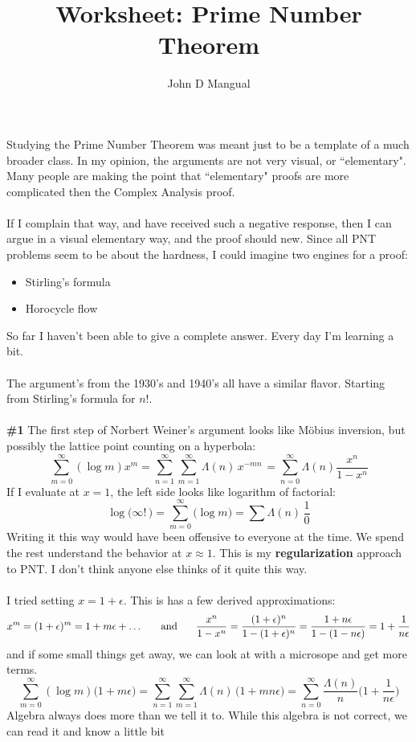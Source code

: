 \documentclass[12pt]{article}
\title{Worksheet: Prime Number Theorem}
\author{John D Mangual}
\date{}
\begin{document}
\selectfont \fontsize{12.5}{15}\selectfont

\maketitle

\noindent Studying the Prime Number Theorem was meant just to be a template of a much broader class.  In my opinion, the arguments are not very visual, or ``elementary".  Many people are making the point that ``elementary" proofs are more complicated then the Complex Analysis proof. \\ \\
If I complain that way, and have received such a negative response, then I can argue in a visual elementary way, and the proof should new.  Since all PNT problems seem to be about the hardness, I could imagine two engines for a proof:
\begin{itemize}
\item Stirling's formula
\item Horocycle flow
\end{itemize}
So far I haven't been able to give a complete answer.  Every day I'm learning a bit. \\ \\
The argument's from the 1930's and 1940's all have a similar flavor.  Starting from Stirling's formula for $n!$.\\ \\
\textbf{\#1} The first step of Norbert Weiner's argument looks like M\"{o}bius inversion, but possibly the lattice point counting on a hyperbola:
$$ \sum_{m=0}^\infty (\log m) x^m = \sum_{n=1}^\infty \sum_{m=1}^\infty \Lambda(n) \, x^{-mn\, } =  \sum_{n= 0}^\infty \Lambda(n) \frac{x^n}{1 - x^n} $$
If I evaluate at $x = 1$, the left side looks like logarithm of factorial:
$$ \log \big(\infty  ! \,\big) = \sum_{m=0}^\infty \big( \log m \big) = \sum \Lambda(n) \, \frac{1}{0} $$
Writing it this way would have been offensive to everyone at the time. We spend the rest understand the behavior at $x \approx 1$. This is my \textbf{regularization} approach to PNT.  I don't think anyone else thinks of it quite this way.  \\ \\
I tried setting $x = 1 + \epsilon$.  This is has a few derived approximations:
$$ x^m = (1 + \epsilon)^m = 1 + m \epsilon + \dots \hspace{0.25in}\text{and}\hspace{0.25in} \frac{x^n}{1 - x^n} =\frac{(1+ \epsilon)^n}{1 - (1+ \epsilon)^n}
= \frac{1 + n \epsilon }{1 - (1 - n \epsilon)} = 1 + \frac{1}{n \epsilon} $$
and if some small things get away, we can look at with a microsope and get more terms.
$$ \sum_{m=0}^\infty (\log m) \big(1 + m \epsilon\big) = \sum_{n=1}^\infty \sum_{m=1}^\infty \Lambda(n) \, \big(1 + mn \epsilon \big)  =  \sum_{n= 0}^\infty \frac{\Lambda(n)}{n} \big( 1 + \frac{1}{n \epsilon}\big)$$
Algebra always does more than we tell it to.  While this algebra is not correct, we can read it and know a little bit
\end{document}
